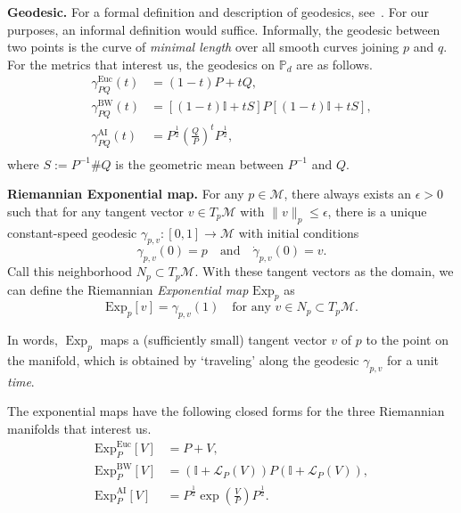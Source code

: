 \documentclass[12pt]{article}
\theoremstyle{definition}
\begin{document}
\textbf{Geodesic.} For a formal definition and description of geodesics, see~\cite{lee2018introduction, do1992riemannian, vishnoi2018geodesic}. For our purposes, an informal definition would suffice. Informally, the geodesic between two points is the curve of \textit{minimal length} over all smooth curves joining $p$ and $q$. For the metrics that interest us, the geodesics on $\mathbb P_d$ are as follows. 
\begin{equation}
    \begin{aligned}
            \gamma_{PQ}^\mathrm{Euc} (t) &= (1-t)P +  t Q, \\
            \gamma_{PQ}^\mathrm{BW} (t) &= [(1-t) \mathbb I + t S] P [(1-t) \mathbb I + t S], \\
            \gamma_{PQ}^\mathrm{AI} (t) &=  P^{\frac12} \left(\frac Q P\right)^t P^{\frac12}, \\ 
    \end{aligned}
\end{equation}
where $S:= P^{-1}  \# Q$ is the geometric mean between $P ^{-1} $ and $Q$. 
 
\textbf{Riemannian Exponential map.} For any $p \in \mathcal M$, there always exists an $\epsilon > 0$ such that for any tangent vector $v \in T_p \mathcal M$ with $\|v\|_p \leq \epsilon $, there is a unique constant-speed geodesic $\gamma_{p,v}:[0,1] \to \mathcal M$ with initial conditions
\begin{equation}
    \gamma_{p,v}(0) = p \quad \text{and} \quad \dot{\gamma}_{p,v}(0) = v.
\end{equation}
Call this neighborhood $N_p \subset T_p \mathcal M$. With these tangent vectors as the domain, we can define the Riemannian \textit{Exponential map} $\mathrm{Exp}_p$ as
\begin{equation}
    \mathrm{Exp}_p[v] = \gamma_{p,v}(1) \quad \text{for any } v \in N_p \subset T_p \mathcal M. 
\end{equation}

In words, $\operatorname{Exp}_p$ maps a (sufficiently small) tangent vector $v$ of $p$ to the point on the manifold, which is obtained by `traveling' along the geodesic $\gamma_{p,v}$ for a unit \textit{time}. 

The exponential maps have the following closed forms for the three Riemannian manifolds that interest us.
\begin{equation}
    \begin{aligned}
            \mathrm{Exp}_P^\mathrm{Euc} [V] &= P + V, \\
            \mathrm{Exp}_P^\mathrm{BW} [V] &= (\mathbb I + \mathcal L_P (V))P(\mathbb I + \mathcal L_P (V)), \\
            \mathrm{Exp}_P^\mathrm{AI} [V] &= P^{\frac12}  \exp\left(\frac VP\right) P^{\frac12} . \\ 
    \end{aligned}
\end{equation}
 
\end{document}
